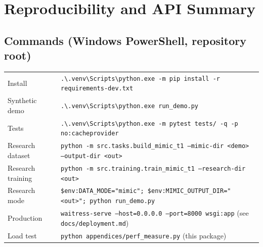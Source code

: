 \chapter{Reproducibility and API Summary}
\label{app:repro}

\section*{Commands (Windows PowerShell, repository root)}
\begin{small}
\begin{tabular}{@{}p{50mm}p{110mm}@{}}
Install & \texttt{.\textbackslash.venv\textbackslash Scripts\textbackslash python.exe -m pip install -r requirements-dev.txt}\\
Synthetic demo & \texttt{.\textbackslash.venv\textbackslash Scripts\textbackslash python.exe run\_demo.py}\\
Tests & \texttt{.\textbackslash.venv\textbackslash Scripts\textbackslash python.exe -m pytest tests/ -q -p no:cacheprovider}\\
Research dataset & \texttt{python -m src.tasks.build\_mimic\_t1 --mimic-dir <demo> --output-dir <out>}\\
Research training & \texttt{python -m src.training.train\_mimic\_t1 --research-dir <out>}\\
Research mode & \texttt{\$env:DATA\_MODE="mimic"; \$env:MIMIC\_OUTPUT\_DIR="<out>"; python run\_demo.py}\\
Production & \texttt{waitress-serve --host=0.0.0.0 --port=8000 wsgi:app} (see \texttt{docs/deployment.md})\\
Load test & \texttt{python appendices/perf\_measure.py} (this package)\\
\end{tabular}
\end{small}

